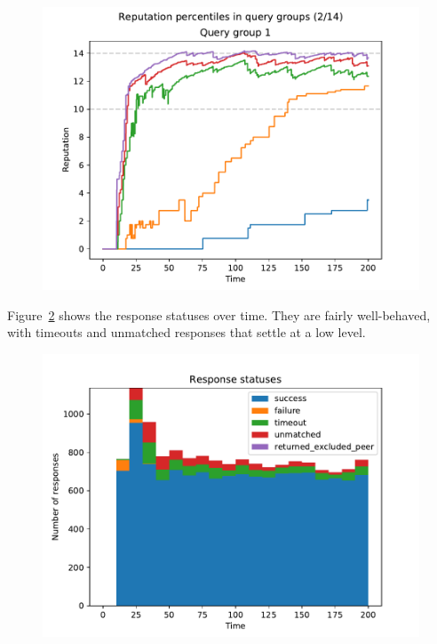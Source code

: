 \begin{figure}[t]
\centering
\includegraphics[width=1\columnwidth]{figures/selection_overlap_rep_percs_2_of_14}
\label{fig:selection_overlap_rep_percs}
\end{figure}

Figure~\ref{fig:selection_overlap_resp_statuses} shows the response statuses
over time. They are fairly well-behaved, with timeouts and unmatched responses
that settle at a low level.

\begin{figure}[t]
\centering
\includegraphics[width=1\columnwidth]{figures/selection_overlap_resp_statuses}
\label{fig:selection_overlap_resp_statuses}
\end{figure}

